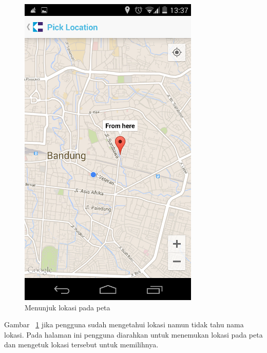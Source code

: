 \begin{figure}[h]
	\centering
		\includegraphics[scale=0.5]{Gambar/KIRI_Android/menunjuk_lokasi}
	\caption{Menunjuk lokasi pada peta}
	\label{fig:menunjuk}
\end{figure}

Gambar ~\ref{fig:menunjuk} jika pengguna sudah mengetahui lokasi namun tidak tahu nama lokasi. Pada halaman ini pengguna diarahkan untuk menemukan lokasi pada peta dan mengetuk lokasi tersebut untuk memilihnya.

